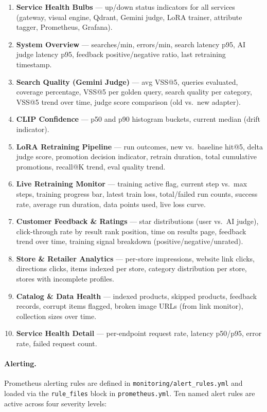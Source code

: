 \documentclass[12pt]{article}
\begin{document}
\begin{enumerate}[leftmargin=*, itemsep=2pt]
    \item \textbf{Service Health Bulbs} --- up/down status indicators for all services (gateway, visual engine, Qdrant, Gemini judge, LoRA trainer, attribute tagger, Prometheus, Grafana).
    \item \textbf{System Overview} --- searches/min, errors/min, search latency p95, AI judge latency p95, feedback positive/negative ratio, last retraining timestamp.
    \item \textbf{Search Quality (Gemini Judge)} --- avg VSS@5, queries evaluated, coverage percentage, VSS@5 per golden query, search quality per category, VSS@5 trend over time, judge score comparison (old vs.\ new adapter).
    \item \textbf{CLIP Confidence} --- p50 and p90 histogram buckets, current median (drift indicator).
    \item \textbf{LoRA Retraining Pipeline} --- run outcomes, new vs.\ baseline hit@5, delta judge score, promotion decision indicator, retrain duration, total cumulative promotions, recall@K trend, eval quality trend.
    \item \textbf{Live Retraining Monitor} --- training active flag, current step vs.\ max steps, training progress bar, latest train loss, total/failed run counts, success rate, average run duration, data points used, live loss curve.
    \item \textbf{Customer Feedback \& Ratings} --- star distributions (user vs.\ AI judge), click-through rate by result rank position, time on results page, feedback trend over time, training signal breakdown (positive/negative/unrated).
    \item \textbf{Store \& Retailer Analytics} --- per-store impressions, website link clicks, directions clicks, items indexed per store, category distribution per store, stores with incomplete profiles.
    \item \textbf{Catalog \& Data Health} --- indexed products, skipped products, feedback records, corrupt items flagged, broken image URLs (from link monitor), collection sizes over time.
    \item \textbf{Service Health Detail} --- per-endpoint request rate, latency p50/p95, error rate, failed request count.
\end{enumerate}

\paragraph{Alerting.}
Prometheus alerting rules are defined in \texttt{monitoring/alert\_rules.yml} and loaded via the \texttt{rule\_files} block in \texttt{prometheus.yml}. Ten named alert rules are active across four severity levels:
\end{document}
